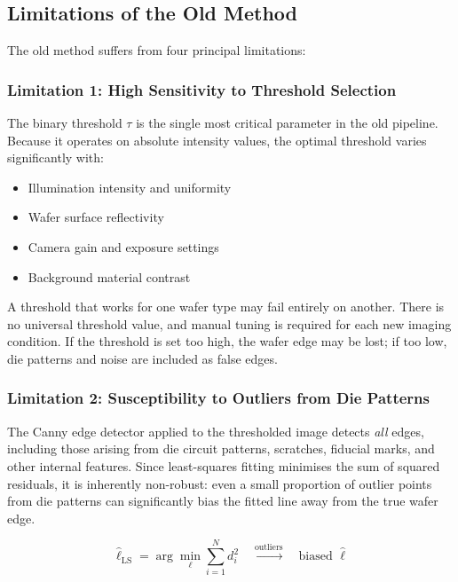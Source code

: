 \documentclass[12pt, a4paper]{article}
\begin{document}
\subsection{Limitations of the Old Method}
\label{sec:limitations}

The old method suffers from four principal limitations:

\subsubsection{Limitation 1: High Sensitivity to Threshold Selection}

The binary threshold $\tau$ is the single most critical parameter in the old pipeline. Because it operates on absolute intensity values, the optimal threshold varies significantly with:
\begin{itemize}
    \item Illumination intensity and uniformity
    \item Wafer surface reflectivity
    \item Camera gain and exposure settings
    \item Background material contrast
\end{itemize}

A threshold that works for one wafer type may fail entirely on another. There is no universal threshold value, and manual tuning is required for each new imaging condition. If the threshold is set too high, the wafer edge may be lost; if too low, die patterns and noise are included as false edges.

\subsubsection{Limitation 2: Susceptibility to Outliers from Die Patterns}

The Canny edge detector applied to the thresholded image detects \emph{all} edges, including those arising from die circuit patterns, scratches, fiducial marks, and other internal features. Since least-squares fitting minimises the sum of squared residuals, it is inherently non-robust: even a small proportion of outlier points from die patterns can significantly bias the fitted line away from the true wafer edge.

\begin{equation}
    \hat{\ell}_{\text{LS}} = \arg\min_\ell \sum_{i=1}^{N} d_i^2 \quad \xrightarrow{\text{outliers}} \quad \text{biased } \hat{\ell}
\end{equation}
\end{document}
